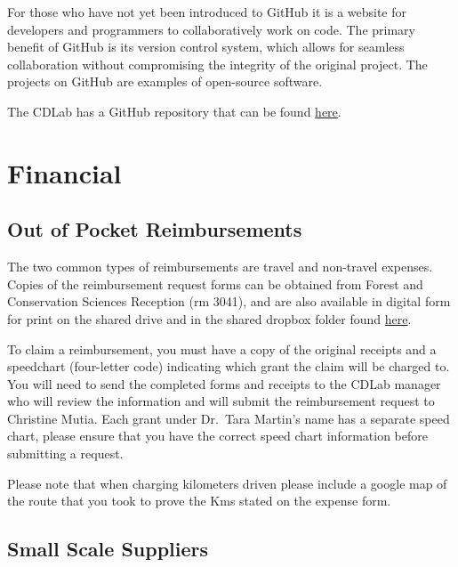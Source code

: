 \documentclass[
]{book}
\begin{document}
For those who have not yet been introduced to GitHub it is a website for developers and programmers to collaboratively work on code. The primary benefit of GitHub is its version control system, which allows for seamless collaboration without compromising the integrity of the original project. The projects on GitHub are examples of open-source software.

The CDLab has a GitHub repository that can be found \href{https://github.com/ConservationDecisionsLab}{here}.

\hypertarget{financial}{%
\chapter*{Financial}\label{financial}}

\hypertarget{reimbursements}{%
\section*{Out of Pocket Reimbursements}\label{reimbursements}}

The two common types of reimbursements are travel and non-travel expenses. Copies of the reimbursement request forms can be obtained from Forest and Conservation Sciences Reception (rm 3041), and are also available in digital form for print on the shared drive and in the shared dropbox folder found \href{https://www.dropbox.com/home/Conservation\%20Decisions\%20Lab/07_Reimbursement\%20forms}{here}.

To claim a reimbursement, you must have a copy of the original receipts and a speedchart (four-letter code) indicating which grant the claim will be charged to. You will need to send the completed forms and receipts to the CDLab manager who will review the information and will submit the reimbursement request to Christine Mutia. Each grant under Dr.~Tara Martin's name has a separate speed chart, please ensure that you have the correct speed chart information before submitting a request.

Please note that when charging kilometers driven please include a google map of the route that you took to prove the Kms stated on the expense form.

\hypertarget{small-scale-suppliers}{%
\section{Small Scale Suppliers}\label{small-scale-suppliers}}
\end{document}
